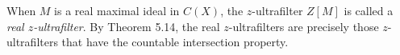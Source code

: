 When $M$ is a real maximal ideal in $C(X)$, the $z$-ultrafilter $Z[M]$ is called a \emph{real $z$-ultrafilter}. By Theorem 5.14, the real $z$-ultrafilters are precisely those $z$-ultrafilters that have the countable intersection property.
